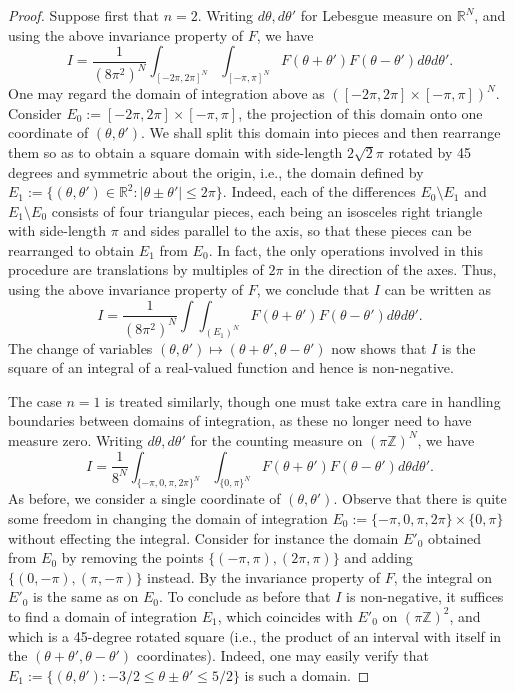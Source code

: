 \documentclass[12pt,reqno]{article}
\def\R{\mathbb{R}}
\def\Z{\mathbb{Z}}
\begin{document}
\begin{proof}
  Suppose first that $n=2$. Writing $d\theta, d\theta'$ for Lebesgue measure on $\R^N$, and using the above invariance property of $F$, we have
  \[ I = \frac{1}{(8\pi^2)^N}\int_{[-2\pi,2\pi]^N} \int_{[-\pi,\pi]^N} F(\theta + \theta')F(\theta-\theta')d\theta d\theta' .\]
  One may regard the domain of integration above as $([-2\pi,2\pi] \times [-\pi,\pi])^N$. Consider $E_0 := [-2\pi,2\pi] \times [-\pi,\pi]$, the projection of this domain onto one coordinate of $(\theta,\theta')$.
We shall split this domain into pieces and then rearrange them so as to obtain a square domain with side-length $2\sqrt{2}\pi$ rotated by 45 degrees and symmetric about the origin, i.e., the domain defined by $E_1 := \{ (\theta,\theta') \in \R^2 : |\theta \pm \theta'|\le 2\pi \}$. Indeed, each of the differences $E_0 \setminus E_1$ and $E_1 \setminus E_0$ consists of four triangular pieces, each being an isosceles right triangle with side-length $\pi$ and sides parallel to the axis, so that these pieces can be rearranged to obtain $E_1$ from $E_0$. In fact, the only operations involved in this procedure are translations by multiples of $2\pi$ in the direction of the axes. Thus, using the above invariance property of $F$, we conclude that $I$ can be written as
\[ I = \frac{1}{(8\pi^2)^{N}}\int \int_{(E_1)^N} F(\theta + \theta')F(\theta-\theta') d\theta d\theta'. \]
  The change of variables $(\theta,\theta')\mapsto(\theta + \theta', \theta - \theta')$ now shows that $I$ is the square of an integral of a real-valued function and hence is non-negative.

  The case $n=1$ is treated similarly, though one must take extra care in handling boundaries between domains of integration, as these no longer need to have measure zero. Writing $d\theta,d\theta'$ for the counting measure on $(\pi\Z)^N$, we have
\[ I = \frac{1}{8^N} \int_{\{-\pi,0,\pi,2\pi\}^N} \int_{\{0,\pi\}^N} F(\theta + \theta')F(\theta-\theta')d\theta d\theta' .\]
As before, we consider a single coordinate of $(\theta,\theta')$.
Observe that there is quite some freedom in changing the domain of integration $E_0 := \{-\pi,0,\pi,2\pi\} \times \{0,\pi\}$ without effecting the integral. Consider for instance the domain $E'_0$ obtained from $E_0$ by removing the points $\{(-\pi,\pi),(2\pi,\pi)\}$ and adding $\{(0,-\pi),(\pi,-\pi)\}$ instead. By the invariance property of $F$, the integral on $E'_0$ is the same as on $E_0$. To conclude as before that $I$ is non-negative, it suffices to find a domain of integration $E_1$, which coincides with $E'_0$ on $(\pi\Z)^2$, and which is a 45-degree rotated square (i.e., the product of an interval with itself in the $(\theta+\theta',\theta-\theta')$ coordinates). Indeed, one may easily verify that $E_1 := \{ (\theta,\theta') : -3/2 \le \theta \pm \theta' \le 5/2  \}$ is such a domain.
\end{proof}
\end{document}
